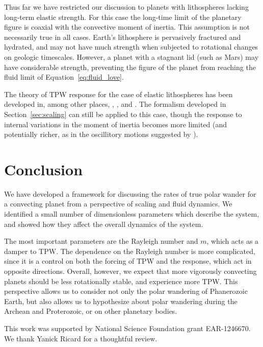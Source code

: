 \documentclass[extra,mreferee]{gji}
\begin{document}
Thus far we have restricted our discussion to planets with lithospheres lacking long-term elastic strength.
For this case the long-time limit of the planetary figure is coaxial with the convective 
moment of inertia. This assumption is not necessarily true in all cases.
Earth's lithosphere is pervasively fractured and hydrated, and may not have much strength when subjected to rotational changes on geologic timescales.
However, a planet with a stagnant lid (such as Mars) may have considerable strength, preventing the figure of the planet 
from reaching the fluid limit of Equation~\eqref{eq:fluid_love}.

The theory of TPW response for the case of elastic lithospheres has been developed in, among other places, 
\citet{matsuyama2006rotational}, \citet{creveling2012mechanisms}, and \citet{chan2014time}.
The formalism developed in Section~\ref{sec:scaling} can still be applied to this case, 
though the response to internal variations in the moment of inertia becomes more limited 
(and potentially richer, as in the oscillitory motions suggested by \citet{creveling2012mechanisms}).

\section{Conclusion}
We have developed a framework for discussing the rates of true polar wander for a convecting planet 
from a perspective of scaling and fluid dynamics.
We identified a small number of dimensionless parameters which describe the system, and showed how they affect the overall dynamics of the system.

The most important parameters are the Rayleigh number and $m$, which acts as a damper to TPW.
The dependence on the Rayleigh number is more complicated, since it is a control on both the forcing 
of TPW and the response, which act in opposite directions.
Overall, however, we expect that more vigorously convecting planets should be less rotationally stable, and experience more TPW.
This perspective allows us to consider not only the polar wandering of Phanerozoic Earth,
but also allows us to hypothesize about polar wandering during the Archean and Proterozoic, or 
on other planetary bodies.

\begin{acknowledgments}
This work was supported by National Science Foundation grant EAR-1246670. We thank Yanick Ricard for a thoughtful review.
\end{acknowledgments}
\end{document}
